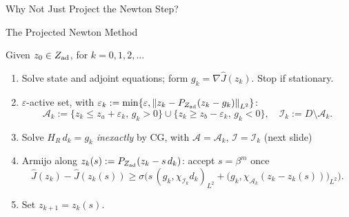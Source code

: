 \documentclass[main.tex]{subfiles}
\begin{document}
\begin{frame}{Why Not Just Project the Newton Step?}

\end{frame}

\begin{frame}[label=pnalg]{The Projected Newton Method}
  \begin{hlbox}
    Given $z_0 \in Z_{\rm ad}$, for $k = 0, 1, 2, \dots$
    \begin{enumerate}
      \item<1-> Solve state and adjoint equations; form $g_k = \nabla\hat J(z_k)$. Stop if stationary.
      \item<2-> $\varepsilon$-active set, with $\varepsilon_k := \min\{\varepsilon, \left\lVert z_k - P_{Z_{\rm ad}}(z_k - g_k) \right\rVert_{L^2}\}$:
        \[
          \mathcal{A}_k := \{ z_k \le z_a + \varepsilon_k,\, g_k > 0 \} \cup \{ z_k \ge z_b - \varepsilon_k,\, g_k < 0 \}, \quad \mathcal{I}_k := D \setminus \mathcal{A}_k .
        \]
      \item<3-> Solve $H_R\, d_k = g_k$ \emph{inexactly} by CG, with $\mathcal{A} = \mathcal{A}_k$, $\mathcal{I} = \mathcal{I}_k$ \hfill (next slide)
      \item<4-> Armijo along $z_k(s) := P_{Z_{\rm ad}}(z_k - s\,d_k)$: accept $s = \beta^m$ once
        \[
          \hat J(z_k) - \hat J(z_k(s)) \ge \sigma\Big( s\,(g_k, \chi_{\mathcal{I}_k} d_k)_{L^2} + \big(g_k, \chi_{\mathcal{A}_k}(z_k - z_k(s))\big)_{L^2} \Big).
        \]
      \item<5-> Set $z_{k+1} = z_k(s)$.
    \end{enumerate}
  \end{hlbox}
\end{frame}
\end{document}
